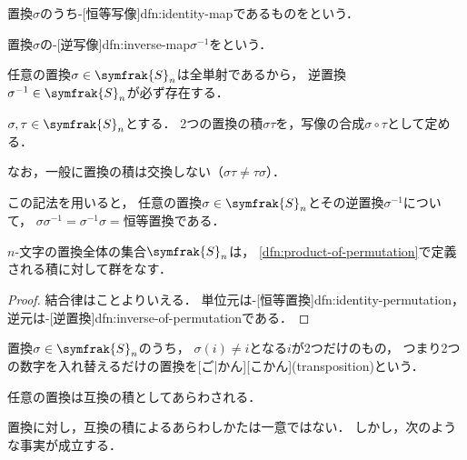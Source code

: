 \documentclass[../sotsu.tex]{subfiles}
\begin{document}
\begin{definition}
    \label{dfn:identity-permutation}
    置換$\sigma$のうち-[恒等写像]{dfn:identity-map}であるものをという．   
\end{definition}

\begin{definition}
    \label{dfn:inverse-of-permutation}
    置換$\sigma$の-[逆写像]{dfn:inverse-map}$\sigma^{-1}$をという．
\end{definition}

任意の置換$\sigma \in \symfrak{S}_n$は全単射であるから，
逆置換$\sigma^{-1} \in \symfrak{S}_n$が必ず存在する．

\begin{definition}[置換の積]
    \label{dfn:product-of-permutation}
    $\sigma, \tau \in \symfrak{S}_n$とする．
    2つの置換の積$\sigma\tau$を，写像の合成$\sigma \circ \tau$として定める．
\end{definition}

なお，一般に置換の積は交換しない（$\sigma \tau \neq \tau \sigma$）．

この記法を用いると，
任意の置換$\sigma \in \symfrak{S}_n$とその逆置換$\sigma^{-1}$について，
$\sigma \sigma^{-1} = \sigma^{-1} \sigma = \text{恒等置換}$である．

\begin{proposition}
    $n$-文字の置換全体の集合$\symfrak{S}_n$は，
    \cref{dfn:product-of-permutation}で定義される積に対して群をなす．
\end{proposition}

\begin{proof}
    結合律はことよりいえる．
    単位元は-[恒等置換]{dfn:identity-permutation}，
    逆元は-[逆置換]{dfn:inverse-of-permutation}である．
\end{proof}

\begin{definition}
    \label{dfn:transposition}
    置換$\sigma \in \symfrak{S}_n$のうち，
    $\sigma(i) \neq i$となる$i$が2つだけのもの，
    つまり2つの数字を入れ替えるだけの置換を[ご|かん][こかん](transposition)という．
\end{definition}

\begin{proposition}
    任意の置換は互換の積としてあらわされる．
\end{proposition}

置換に対し，互換の積によるあらわしかたは一意ではない．
しかし，次のような事実が成立する．
\end{document}
